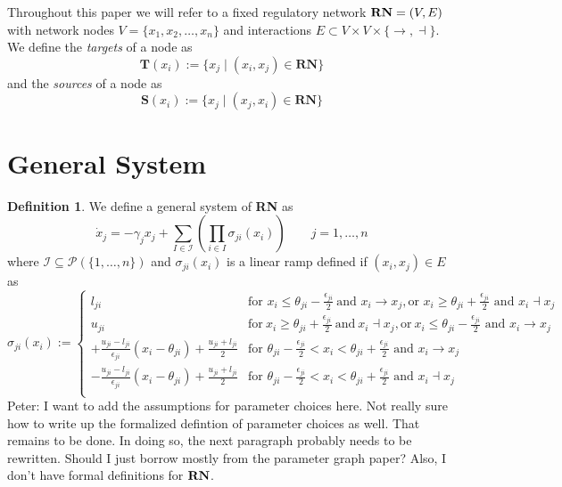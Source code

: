\documentclass[12pt]{article}
\theoremstyle{definition}
\newtheorem{defn}{Definition}[section]
\theoremstyle{remark}
\newcommand{\cI}{\mathcal{I}}
\begin{document}
Throughout this paper we will refer to a fixed regulatory network $\textnormal{\textbf{RN}} = (V,E)$ with network nodes $V = \{x_1,x_2,\dots,x_n\}$ and interactions $E \subset V \times V \times \{\rightarrow,\dashv\}$. We define the \textit{targets} of a node as
\begin{equation*}
\mathbf{T}(x_i):=\{x_j \mid (x_i,x_j) \in \mathbf{RN} \}
\end{equation*}
and the \textit{sources} of a node as 
\begin{equation*}
\mathbf{S}(x_i):=\{x_j \mid (x_j,x_i) \in \mathbf{RN} \}
\end{equation*}

\section{General System}
\begin{defn}
We define a general system of \textbf{RN} as 
\begin{equation}	\label{generalsystem}
\dot{x}_j=-\gamma_j x_j + \sum_{I\in \mathcal{I}}\left(\prod_{i\in I}\sigma_{ji}(x_i)\right)	\qquad	j=1,\dots,n
\end{equation}
where $\cI\subseteq \mathscr{P} (\{1,\dots,n\})$ and $\sigma_{ji}(x_i)$  is a linear ramp defined if $(x_i,x_j) \in E$ as
\begin{equation}	\label{sigma}
\sigma_{ji}(x_i):=
\begin{cases}
l_{ji}	&	\text{for } x_i \le \theta_{ji}-\frac{\epsilon_{ji}}{2}\ \text{and } x_i\to x_j, \text{or } x_i\geq\theta_{ji}+\frac{\epsilon_{ji}}{2} \text{ and } x_i\dashv x_j\\
u_{ji}	&	\text{for}\ x_i \geq\theta_{ji}+\frac{\epsilon_{ji}}{2}\ \text{and}\ x_i\dashv x_j, \text{or}\ x_i\le\theta_{ji}-\frac{\epsilon_{ji}}{2} \text{ and } x_i\to x_j\\
+\frac{u_{ji}-l_{ji}}{\epsilon_{ji}}(x_i-\theta_{ji}) + \frac{u_{ji}+l_{ji}}{2} &  \text{for } \theta_{ji}-\frac{\epsilon_{ji}}{2}<x_i<\theta_{ji}+\frac{\epsilon_{ji}}{2} \text{ and } x_i\to x_j\\
-\frac{u_{ji}-l_{ji}}{\epsilon_{ji}}(x_i-\theta_{ji}) + \frac{u_{ji}+l_{ji}}{2} & \text{for } \theta_{ji}-\frac{\epsilon_{ji}}{2}<x_i<\theta_{ji}+\frac{\epsilon_{ji}}{2} \text{ and } x_i\dashv x_j\\
\end{cases}
\end{equation}	
{\color{cyan} Peter: I want to add the assumptions for parameter choices here. Not really sure how to write up the formalized defintion of parameter choices as well. That remains to be done. In doing so, the next paragraph probably needs to be rewritten. Should I just borrow mostly from the parameter graph paper? Also, I don't have formal definitions for $\textnormal{\textbf{RN}}$.}
\end{defn}
\end{document}
